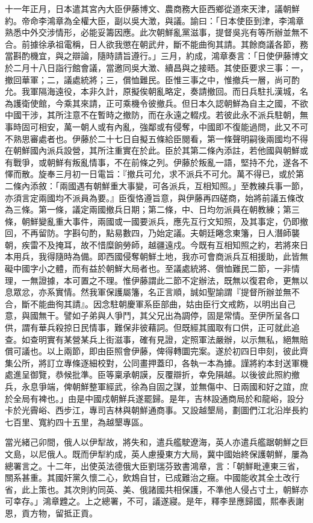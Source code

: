 \begin{pinyinscope}
十一年正月，日本遣其宮內大臣伊藤博文、農商務大臣西鄉從道來天津，議朝鮮約。帝命李鴻章為全權大臣，副以吳大澂，與議。諭曰：「日本使臣到津，李鴻章熟悉中外交涉情形，必能妥籌因應。此次朝鮮亂黨滋事，提督吳兆有等所辦並無不合。前據徐承祖電稱，日人欲我懲在朝武弁，斷不能曲徇其請。其餘商議各節，務當斟酌機宜，與之辯論，隨時請旨遵行。」三月，約成，鴻章奏言：「日使伊藤博文於二月十八日詣行館會議，當邀同吳大澂、續昌與之接晤。其使臣要求三事：一，撤回華軍；二，議處統將；三，償恤難民。臣惟三事之中，惟撤兵一層，尚可酌允。我軍隔海遠役，本非久計，原擬俟朝亂略定，奏請撤回。而日兵駐扎漢城，名為護衛使館，今乘其來請，正可乘機令彼撤兵。但日本久認朝鮮為自主之國，不欲中國干涉，其所注意不在暫時之撤防，而在永遠之輟戍。若彼此永不派兵駐朝，無事時固可相安，萬一朝人或有內亂，強鄰或有侵奪，中國即不復能過問，此又不可不熟思審處者也。伊藤於二十七日自擬五條給臣閱看，第一條聲明嗣後兩國均不得在朝鮮國內派兵設營，其所注重實在於此。臣於其第二條內添註，若他國與朝鮮或有戰爭，或朝鮮有叛亂情事，不在前條之列。伊藤於叛亂一語，堅持不允，遂各不懌而散。旋奉三月初一日電旨：『撤兵可允，求不派兵不可允。萬不得已，或於第二條內添敘：「兩國遇有朝鮮重大事變，可各派兵，互相知照。」至教練兵事一節，亦須言定兩國均不派員為要。』臣復恪遵旨意，與伊藤再四磋商，始將前議五條改為三條。第一條，議定兩國撤兵日期；第二條，中、日均勿派員在朝教練；第三條，朝鮮變亂重大事件，兩國或一國要派兵，應先互行文知照，及其事定，仍即撤回，不再留防。字斟句酌，點易數四，乃始定議。夫朝廷睠念東籓，日人潛師襲朝，疾雷不及掩耳，故不惜糜餉勞師，越疆遠戍。今既有互相知照之約，若將來日本用兵，我得隨時為備。即西國侵奪朝鮮土地，我亦可會商派兵互相援助，此皆無礙中國字小之體，而有益於朝鮮大局者也。至議處統將、償恤難民二節，一非情理，一無證據，本可置之不理。惟伊藤謂此二節不定辦法，既無以復君命，更無以息眾忿，亦系實情。然我軍保護屬籓，名正言順，誠如聖諭謂『提督所辦並無不合，斷不能曲徇其請』。因念駐朝慶軍系臣部曲，姑由臣行文戒飭，以明出自己意，與國無干。譬如子弟與人爭鬥，其父兄出為調停，固是常情。至伊所呈各口供，謂有華兵殺掠日民情事，難保非彼藉詞。但既經其國取有口供，正可就此追查。如查明實有某營某兵上街滋事，確有見證，定照軍法嚴辦，以示無私，絕無賠償可議也。以上兩節，即由臣照會伊藤，俾得轉圜完案。遂於初四日申刻，彼此齊集公所，將訂立專條逐細校對，公同畫押蓋印，各執一本為據。謹將約本封送軍機處進呈御覽，恭候批準。臣等稟承朝謨，反覆辯折，幸免隕越。以後彼此照約撤兵，永息爭端，俾朝鮮整軍經武，徐為自固之謀，並無傷中、日兩國和好之誼，庶於全局有裨也。」由是中國戍朝鮮兵遂罷歸。是年，吉林設通商局於和龍峪，設分卡於光霽峪、西步江，專司吉林與朝鮮通商事。又設越墾局，劃圖們江北沿岸長約七百里、寬約四十五里，為越墾專區。

當光緒己卯間，俄人以伊犁故，將失和，遣兵艦駛遼海，英人亦遣兵艦踞朝鮮之巨文島，以尼俄人。既而伊犁約成，英人慮擾東方大局，冀中國始終保護朝鮮，屢為總署言之。十二年，出使英法德俄大臣劉瑞芬致書鴻章，言：「朝鮮毗連東三省，關系甚重。其國奸黨久懷二心，飲鴆自甘，已成難治之癥。中國能收其全土改行省，此上策也。其次則約同英、美、俄諸國共相保護，不準他人侵占寸土，朝鮮亦可幸存。」鴻章韙之。上之總署，不可，議遂寢。是年，釋李昰應歸國，熙奉表謝恩，貢方物，留抵正貢。


\end{pinyinscope}
